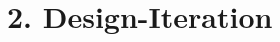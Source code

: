 \documentclass[.../Dokumentation.tex]{subfiles}
\begin{document}
    \section{2. Design-Iteration}\label{sec-ita2}
\end{document}
